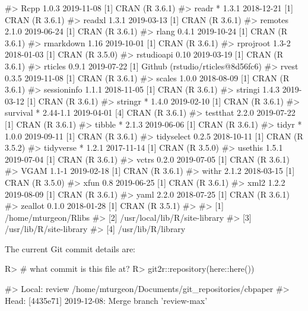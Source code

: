\documentclass[
]{jss}
\begin{document}
\begin{CodeChunk}
\begin{CodeOutput}
#>  Rcpp          1.0.3      2019-11-08 [1] CRAN (R 3.6.1)                  
#>  readr       * 1.3.1      2018-12-21 [1] CRAN (R 3.6.1)                  
#>  readxl        1.3.1      2019-03-13 [1] CRAN (R 3.6.1)                  
#>  remotes       2.1.0      2019-06-24 [1] CRAN (R 3.6.1)                  
#>  rlang         0.4.1      2019-10-24 [1] CRAN (R 3.6.1)                  
#>  rmarkdown     1.16       2019-10-01 [1] CRAN (R 3.6.1)                  
#>  rprojroot     1.3-2      2018-01-03 [1] CRAN (R 3.5.0)                  
#>  rstudioapi    0.10       2019-03-19 [1] CRAN (R 3.6.1)                  
#>  rticles       0.9.1      2019-07-22 [1] Github (rstudio/rticles@8d56fc6)
#>  rvest         0.3.5      2019-11-08 [1] CRAN (R 3.6.1)                  
#>  scales        1.0.0      2018-08-09 [1] CRAN (R 3.6.1)                  
#>  sessioninfo   1.1.1      2018-11-05 [1] CRAN (R 3.6.1)                  
#>  stringi       1.4.3      2019-03-12 [1] CRAN (R 3.6.1)                  
#>  stringr     * 1.4.0      2019-02-10 [1] CRAN (R 3.6.1)                  
#>  survival    * 2.44-1.1   2019-04-01 [4] CRAN (R 3.6.1)                  
#>  testthat      2.2.0      2019-07-22 [1] CRAN (R 3.6.1)                  
#>  tibble      * 2.1.3      2019-06-06 [1] CRAN (R 3.6.1)                  
#>  tidyr       * 1.0.0      2019-09-11 [1] CRAN (R 3.6.1)                  
#>  tidyselect    0.2.5      2018-10-11 [1] CRAN (R 3.5.2)                  
#>  tidyverse   * 1.2.1      2017-11-14 [1] CRAN (R 3.5.0)                  
#>  usethis       1.5.1      2019-07-04 [1] CRAN (R 3.6.1)                  
#>  vctrs         0.2.0      2019-07-05 [1] CRAN (R 3.6.1)                  
#>  VGAM          1.1-1      2019-02-18 [1] CRAN (R 3.6.1)                  
#>  withr         2.1.2      2018-03-15 [1] CRAN (R 3.5.0)                  
#>  xfun          0.8        2019-06-25 [1] CRAN (R 3.6.1)                  
#>  xml2          1.2.2      2019-08-09 [1] CRAN (R 3.6.1)                  
#>  yaml          2.2.0      2018-07-25 [1] CRAN (R 3.6.1)                  
#>  zeallot       0.1.0      2018-01-28 [1] CRAN (R 3.5.1)                  
#> 
#> [1] /home/mturgeon/Rlibs
#> [2] /usr/local/lib/R/site-library
#> [3] /usr/lib/R/site-library
#> [4] /usr/lib/R/library
\end{CodeOutput}
\end{CodeChunk}

The current Git commit details are:

\begin{CodeChunk}

\begin{CodeInput}
R> # what commit is this file at? 
R> git2r::repository(here::here())
\end{CodeInput}

\begin{CodeOutput}
#> Local:    review /home/mturgeon/Documents/git_repositories/cbpaper
#> Head:     [4435e71] 2019-12-08: Merge branch 'review-max'
\end{CodeOutput}
\end{CodeChunk}


\end{document}
